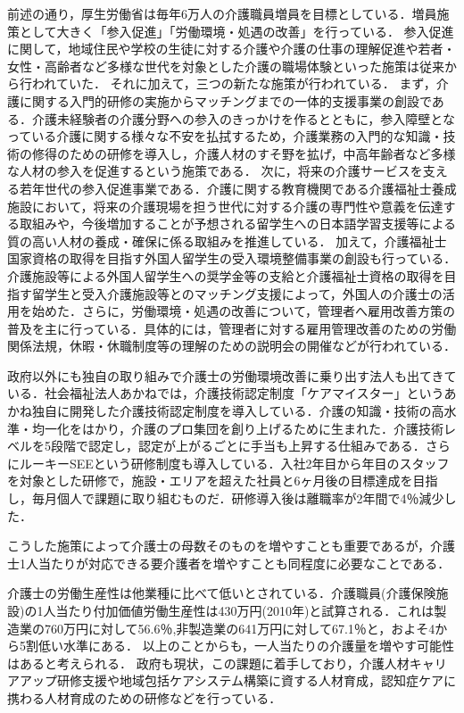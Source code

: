 前述の通り，厚生労働省は毎年6万人の介護職員増員を目標としている．増員施策として大きく「参入促進」「労働環境・処遇の改善」を行っている．
参入促進に関して，地域住民や学校の生徒に対する介護や介護の仕事の理解促進や若者・女性・高齢者など多様な世代を対象とした介護の職場体験といった施策は従来から行われていた．
それに加えて，三つの新たな施策が行われている．
まず，介護に関する入門的研修の実施からマッチングまでの一体的支援事業の創設である．介護未経験者の介護分野への参入のきっかけを作るとともに，参入障壁となっている介護に関する様々な不安を払拭するため，介護業務の入門的な知識・技術の修得のための研修を導入し，介護人材のすそ野を拡げ，中高年齢者など多様な人材の参入を促進するという施策である．
次に，将来の介護サービスを支える若年世代の参入促進事業である．介護に関する教育機関である介護福祉士養成施設において，将来の介護現場を担う世代に対する介護の専門性や意義を伝達する取組みや，今後増加することが予想される留学生への日本語学習支援等による質の高い人材の養成・確保に係る取組みを推進している．
加えて，介護福祉士国家資格の取得を目指す外国人留学生の受入環境整備事業の創設も行っている．介護施設等による外国人留学生への奨学金等の支給と介護福祉士資格の取得を目指す留学生と受入介護施設等とのマッチング支援によって，外国人の介護士の活用を始めた．さらに，労働環境・処遇の改善について，管理者へ雇用改善方策の普及を主に行っている．具体的には，管理者に対する雇用管理改善のための労働関係法規，休暇・休職制度等の理解のための説明会の開催などが行われている．

政府以外にも独自の取り組みで介護士の労働環境改善に乗り出す法人も出てきている．社会福祉法人あかねでは，介護技術認定制度「ケアマイスター」というあかね独自に開発した介護技術認定制度を導入している．介護の知識・技術の高水準・均一化をはかり，介護のプロ集団を創り上げるために生まれた．介護技術レベルを5段階で認定し，認定が上がるごとに手当も上昇する仕組みである．さらにルーキーSEEという研修制度も導入している．入社2年目から年目のスタッフを対象とした研修で，施設・エリアを超えた社員と6ヶ月後の目標達成を目指し，毎月個人で課題に取り組むものだ．研修導入後は離職率が2年間で4％減少した．

こうした施策によって介護士の母数そのものを増やすことも重要であるが，介護士1人当たりが対応できる要介護者を増やすことも同程度に必要なことである．

介護士の労働生産性は他業種に比べて低いとされている．介護職員(介護保険施設)の1人当たり付加価値労働生産性は430万円(2010年)と試算される．これは製造業の760万円に対して56.6％,非製造業の641万円に対して67.1％と，およそ4から5割低い水準にある．
以上のことからも，一人当たりの介護量を増やす可能性はあると考えられる．
政府も現状，この課題に着手しており，介護人材キャリアアップ研修支援や地域包括ケアシステム構築に資する人材育成，認知症ケアに携わる人材育成のための研修などを行っている．

